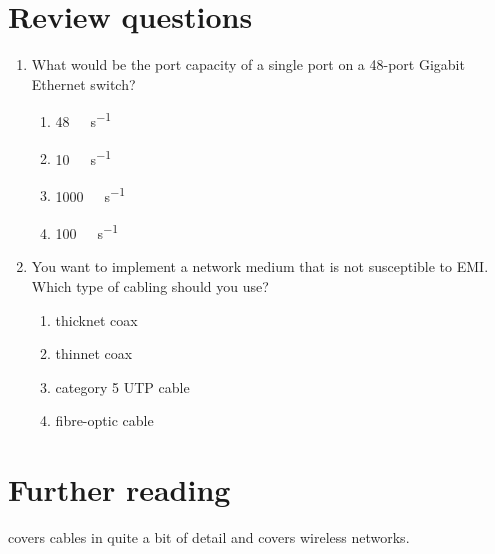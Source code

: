 \section{Review questions}
\begin{enumerate}
\item What would be the port capacity of a single port on a 48-port Gigabit Ethernet switch?
   \begin{enumerate}
      \item \SI{48}{\giga\bit\per\second}
      \item \SI{10}{\mega\bit\per\second}
      \item \SI{1000}{\mega\bit\per\second}
      \item \SI{100}{\mega\bit\per\second}
   \end{enumerate}
\item
   You want to implement a network medium that is not susceptible to \acs{EMI}.
   Which type of cabling should you use?
   \begin{enumerate}
   \item thicknet coax
   \item thinnet coax
   \item category 5 \acs{UTP} cable
   \item fibre-optic cable
   \end{enumerate}
\end{enumerate}

\section{Further reading}
\textcite{oliviero} covers cables in quite a bit of detail and \textcite{coleman} covers wireless networks.
